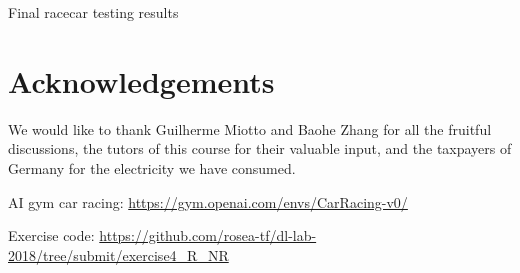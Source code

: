 \documentclass[a4paper, 11pt, conference]{ieeeconf}      %
\begin{document}
\begin{table}
  \centering
  \caption{Final racecar testing results}
  \label{table:results}
  
  \end{table}

\section*{Acknowledgements}

We would like to thank Guilherme Miotto and Baohe Zhang for all the fruitful discussions, the tutors of this course for their valuable input, and the taxpayers of Germany for the electricity we have consumed.


\begin{thebibliography}{99}

 AI gym car racing: \url{https://gym.openai.com/envs/CarRacing-v0/}

 Exercise code: \url{https://github.com/rosea-tf/dl-lab-2018/tree/submit/exercise4_R_NR}

\end{thebibliography}

\end{document}
